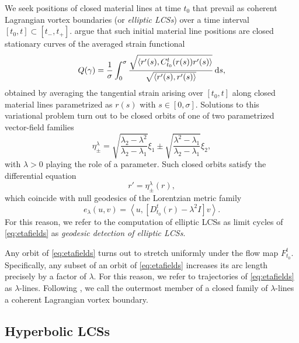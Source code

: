 \documentclass{article}
\begin{document}
We seek positions of closed material lines at time $t_0$ that prevail as coherent Lagrangian vortex boundaries (or \emph{elliptic LCSs}) over a time interval $[t_0,t]\subset[t_-,t_+]$.
\textcite{haller13:_coher_lagran,haller14:_adden_coher_lagran} argue that such initial material line positions are closed stationary curves of the averaged strain functional
\[
Q(\gamma) = \frac{1}{\sigma} \int_0^\sigma \frac{\sqrt{\langle r'(s),C_{t_0}^t(r(s))r'(s)\rangle}}{\sqrt{\langle r'(s),r'(s)\rangle}} \dif s,
\]
obtained by averaging the tangential strain arising over $[t_0,t]$ along closed material lines parametrized as $r(s)$ with $s \in [0,\sigma].$
Solutions to this variational problem turn out to be closed orbits of one of two parametrized vector-field families
\begin{equation}
\eta_\pm^\lambda = \sqrt{\frac{\lambda_2 - \lambda^2}{\lambda_2 - \lambda_1}} \xi_1 \pm \sqrt{\frac{\lambda^2 - \lambda_1}{\lambda_2 - \lambda_1}}\xi_2,
\label{eq:eta}
\end{equation}
with $\lambda > 0$ playing the role of a parameter. Such closed orbits satisfy the differential equation
\begin{equation}
r' = \eta_\pm^\lambda(r),
\label{eq:etafields}
\end{equation}
which coincide with null geodesics of the Lorentzian metric family
\[
e_\lambda(u,v) = \left\langle u,\left[D_{t_0}^t(r) - \lambda^2 I\right] v \right\rangle.
\]
For this reason, we refer to the computation of elliptic LCSs as limit cycles of \cref{eq:etafields} as \emph{geodesic detection of elliptic LCSs}.

Any orbit of \cref{eq:etafields} turns out to stretch uniformly under the flow map $F_{t_0}^t$.
Specifically, any subset of an orbit of \cref{eq:etafields} increases its arc length precisely by a factor of $\lambda$.
For this reason, we refer to trajectories of \cref{eq:etafields} as $\lambda$-lines.
Following \textcite{haller13:_coher_lagran,haller14:_adden_coher_lagran}, we call the outermost member of a closed family of $\lambda$-lines a coherent Lagrangian vortex boundary.

\subsection{Hyperbolic LCSs}
\label{s:Hyperbolic LCSs}
\end{document}
